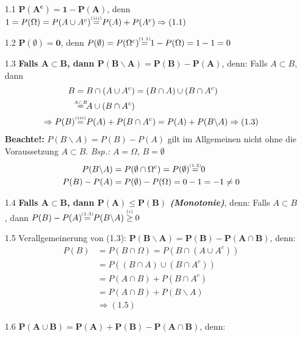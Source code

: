 \documentclass[a4paper,11pt]{article}
\newcommand\eqthreei{\overset{\mathclap{\scriptscriptstyle (iii)}}{=}}
\newcommand\eqoneone{\overset{\mathclap{\scriptscriptstyle (1.1)}}{=}}
\newcommand\eqonetwo{\overset{\mathclap{\scriptscriptstyle (1.2)}}{=}}
\newcommand\eqonethree{\overset{\mathclap{\scriptscriptstyle (1.3)}}{=}}
\newcommand\eqasb{\overset{\mathclap{\scriptscriptstyle A \subset B}}{=}}
\newcommand\geqonei{\overset{\mathclap{\scriptscriptstyle (i)}}{\geq}}
\begin{document}
\begin{itemize}
    \item[1.1] $\mathbf{P(A^c)=1-P(A)}$, denn $1=P(\Omega)=P(A\cup A^c) \eqthreei P(A) + P(A^c) \Rightarrow (1.1)$
    \item[1.2] $\mathbf{P(\emptyset)=0}$, denn $P(\emptyset)=P(\Omega^c) \eqoneone 1-P(\Omega) = 1-1 = 0$
    \item[1.3] \textbf{Falls $\mathbf{A\subset B}$, dann $\mathbf{P(B \backslash A)=P(B)-P(A)}$}, denn: 
        \newline Falls $A\subset B$, dann \begin{align*}
        B &= B\cap (A\cup A^c) = (B\cap A) \cup (B \cap A^c)\\
        &\eqasb A\cup (B \cap A^c) \\
        \Rightarrow P(B) &\eqthreei P(A) + P(B\cap A^c) = P(A) + P(B \backslash A) \Rightarrow (1.3)\\
        \end{align*}
        \textbf{Beachte!:} $P(B \backslash A) = P(B)-P(A)$ gilt im Allgemeinen nicht ohne die Voraussetzung $A \subset B$.
        \textit{Bsp.:} $A=\Omega$, $B=\emptyset$
        \begin{align*}
        P(B \backslash A) &= P(\emptyset \cap \Omega^c) = P(\emptyset) \eqonetwo 0\\
        P(B)-P(A) &= P(\emptyset)-P(\Omega) = 0-1 = -1 \neq 0\\
        \end{align*}
    \item[1.4] \textbf{Falls $\mathbf{A \subset B}$, dann $ \mathbf{P(A) \leq P(B)}$ \textit{(Monotonie)}}, denn: 
        \newline Falls $A \subset B$, dann $P(B)-P(A) \eqonethree P(B \backslash A) \geqonei 0$
    \item[1.5] Verallgemeinerung von (1.3): $\mathbf{P(B \backslash A) = P(B) - P(A\cap B)}$, 
        denn: 
        \begin{align*}
        P(B) &= P(B\cap\Omega) =P(B \cap (A \cup A^c))\\
        &= P((B\cap A) \cup (B\cap A^c))\\
        &= P(A\cap B) + P(B\cap A^c)\\
        &= P(A\cap B) + P(B \backslash A)\\
        &\Rightarrow (1.5)
        \end{align*}
    \item[1.6] $\mathbf{P(A\cup B) = P(A)+P(B) - P(A\cap B)}$, denn: 
        \begin{align*}

\end{align*}
\end{itemize}
\end{document}
